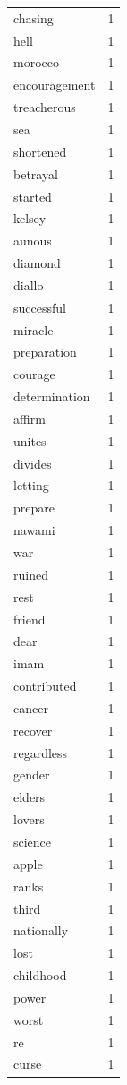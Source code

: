 \begin{tabular}{lr}
chasing & 1 \\
hell & 1 \\
morocco & 1 \\
encouragement & 1 \\
treacherous & 1 \\
sea & 1 \\
shortened & 1 \\
betrayal & 1 \\
started & 1 \\
kelsey & 1 \\
aunous & 1 \\
diamond & 1 \\
diallo & 1 \\
successful & 1 \\
miracle & 1 \\
preparation & 1 \\
courage & 1 \\
determination & 1 \\
affirm & 1 \\
unites & 1 \\
divides & 1 \\
letting & 1 \\
prepare & 1 \\
nawami & 1 \\
war & 1 \\
ruined & 1 \\
rest & 1 \\
friend & 1 \\
dear & 1 \\
imam & 1 \\
contributed & 1 \\
cancer & 1 \\
recover & 1 \\
regardless & 1 \\
gender & 1 \\
elders & 1 \\
lovers & 1 \\
science & 1 \\
apple & 1 \\
ranks & 1 \\
third & 1 \\
nationally & 1 \\
lost & 1 \\
childhood & 1 \\
power & 1 \\
worst & 1 \\
re & 1 \\
curse & 1 \\

\end{tabular}
